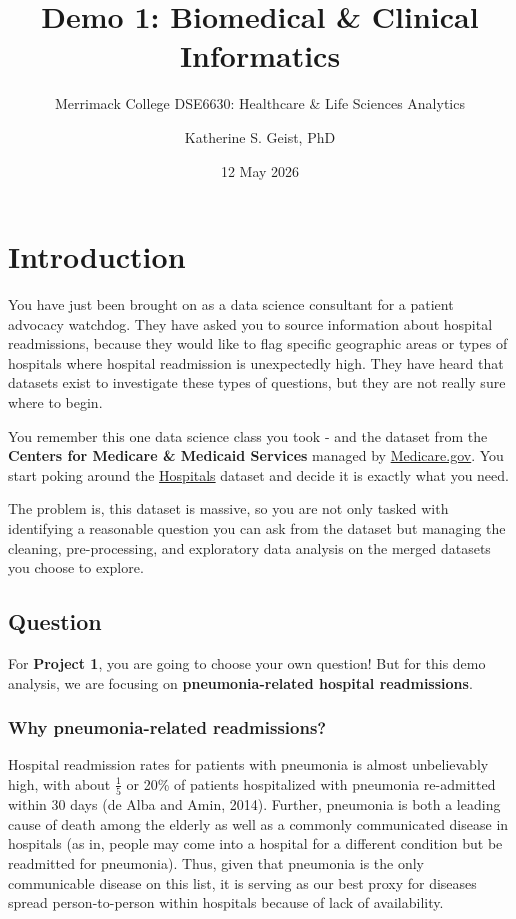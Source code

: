 \documentclass[
]{article}
\title{Demo 1: Biomedical \& Clinical Informatics}
\subtitle{Merrimack College DSE6630: Healthcare \& Life Sciences
Analytics}
\author{Katherine S. Geist, PhD}
\date{12 May 2026}
\begin{document}
\maketitle

{
\setcounter{tocdepth}{2}
\tableofcontents
}
\section{Introduction}\label{introduction}

You have just been brought on as a data science consultant for a patient
advocacy watchdog. They have asked you to source information about
hospital readmissions, because they would like to flag specific
geographic areas or types of hospitals where hospital readmission is
unexpectedly high. They have heard that datasets exist to investigate
these types of questions, but they are not really sure where to begin.

You remember this one data science class you took - and the dataset from
the \textbf{Centers for Medicare \& Medicaid Services} managed by
\href{https://www.medicare.gov}{Medicare.gov}. You start poking around
the
\href{https://data.cms.gov/provider-data/topics/hospitals}{Hospitals}
dataset and decide it is exactly what you need.

The problem is, this dataset is massive, so you are not only tasked with
identifying a reasonable question you can ask from the dataset but
managing the cleaning, pre-processing, and exploratory data analysis on
the merged datasets you choose to explore.

\subsection{Question}\label{question}

For \textbf{Project 1}, you are going to choose your own question! But
for this demo analysis, we are focusing on \textbf{pneumonia-related
hospital readmissions}.

\subsubsection{Why pneumonia-related
readmissions?}\label{why-pneumonia-related-readmissions}

Hospital readmission rates for patients with pneumonia is almost
unbelievably high, with about \(\frac{1}{5}\) or 20\% of patients
hospitalized with pneumonia re-admitted within 30 days (de Alba and
Amin, 2014). Further, pneumonia is both a leading cause of death among
the elderly as well as a commonly communicated disease in hospitals (as
in, people may come into a hospital for a different condition but be
readmitted for pneumonia). Thus, given that pneumonia is the only
communicable disease on this list, it is serving as our best proxy for
diseases spread person-to-person within hospitals because of lack of
availability.
\end{document}
